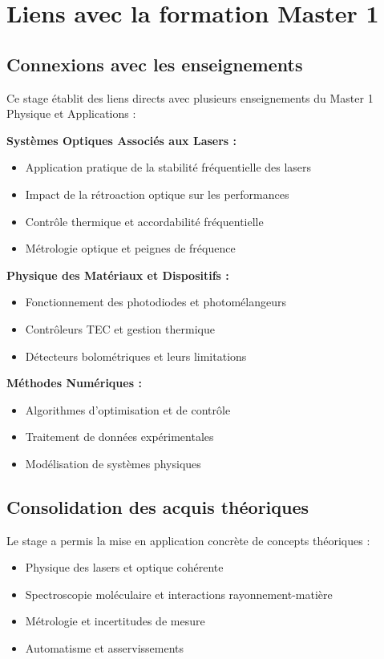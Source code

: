 \section{Liens avec la formation Master 1}

\subsection{Connexions avec les enseignements}

Ce stage établit des liens directs avec plusieurs enseignements du Master 1 Physique et Applications :

\textbf{Systèmes Optiques Associés aux Lasers :}
\begin{itemize}
    \item Application pratique de la stabilité fréquentielle des lasers
    \item Impact de la rétroaction optique sur les performances
    \item Contrôle thermique et accordabilité fréquentielle
    \item Métrologie optique et peignes de fréquence
\end{itemize}

\textbf{Physique des Matériaux et Dispositifs :}
\begin{itemize}
    \item Fonctionnement des photodiodes et photomélangeurs
    \item Contrôleurs TEC et gestion thermique
    \item Détecteurs bolométriques et leurs limitations
\end{itemize}

\textbf{Méthodes Numériques :}
\begin{itemize}
    \item Algorithmes d'optimisation et de contrôle
    \item Traitement de données expérimentales
    \item Modélisation de systèmes physiques
\end{itemize}

\subsection{Consolidation des acquis théoriques}

Le stage a permis la mise en application concrète de concepts théoriques :
\begin{itemize}
    \item Physique des lasers et optique cohérente
    \item Spectroscopie moléculaire et interactions rayonnement-matière
    \item Métrologie et incertitudes de mesure
    \item Automatisme et asservissements
\end{itemize}

